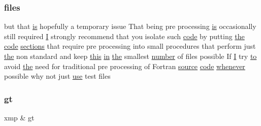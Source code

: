 \subsubsection{\texorpdfstring{files}{files}}
{\footnotesize\ttfamily but that \hyperlink{intro__blas1_83_8txt_a42a91df93f840595de3019ceb5d1df23}{is} hopefully a temporary issue That being pre processing \hyperlink{intro__blas1_83_8txt_a42a91df93f840595de3019ceb5d1df23}{is} occasionally still required \hyperlink{continue_87_8txt_ae7b8826453d28f1bdb2fba7e889eb23b}{I} strongly recommend that you isolate such \hyperlink{ufpp__overview_81_8txt_a74a0615f2d9c4a398d9126096f8092f8}{code} by putting \hyperlink{M__stopwatch_83_8txt_a0f266597de2e57eb3aa964927bb30e14}{the} \hyperlink{ufpp__overview_81_8txt_a74a0615f2d9c4a398d9126096f8092f8}{code} \hyperlink{intro__blas1_83_8txt_aa06cca0b542e18027a508f939187fc96}{sections} that require pre processing into small procedures that perform just \hyperlink{M__stopwatch_83_8txt_a0f266597de2e57eb3aa964927bb30e14}{the} non standard and keep \hyperlink{M__stopwatch_83_8txt_ad62a52042bb610eee5b36b5516caec22}{this} \hyperlink{M__journal_83_8txt_afce72651d1eed785a2132bee863b2f38}{in} \hyperlink{M__stopwatch_83_8txt_a0f266597de2e57eb3aa964927bb30e14}{the} smallest \hyperlink{what__overview_81_8txt_a3b215423c351b7d527eb75d2456331cf}{number} of files possible If \hyperlink{continue_87_8txt_ae7b8826453d28f1bdb2fba7e889eb23b}{I} try \hyperlink{M__stopwatch_83_8txt_a97209fd3e34ef701c0a9734280779cbb}{to} avoid \hyperlink{M__stopwatch_83_8txt_a0f266597de2e57eb3aa964927bb30e14}{the} need for traditional pre processing of Fortran \hyperlink{ufpp__overview_81_8txt_a4d6669ece605d05985c83a04dd38e0ad}{source} \hyperlink{ufpp__overview_81_8txt_a74a0615f2d9c4a398d9126096f8092f8}{code} \hyperlink{do_87_8txt_a810fd937840b16353708346232656a5f}{whenever} possible why not just \hyperlink{intro__blas1_83_8txt_a04fa2694d85f67a675bb3f45f7241f48}{use} test files}

\mbox{\label{ufpp__overview_81_8txt_a592afc8cd0f50f331c87d631446d4186}} 
\subsubsection{\texorpdfstring{gt}{gt}}
{\footnotesize\ttfamily xmp \& gt}

\mbox{\label{ufpp__overview_81_8txt_a3ae3ec26b7cfe41ade65d08668214c9c}} 
